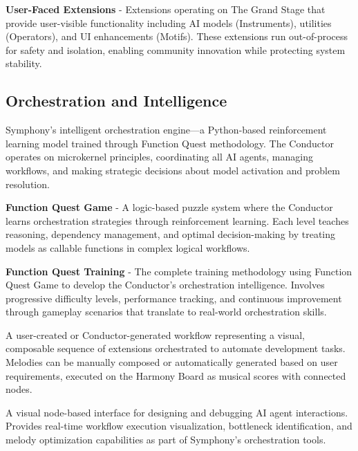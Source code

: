 \begin{description}[leftmargin=4cm,labelwidth=3.5cm]
\item[\textbf{UFE}] \textbf{User-Faced Extensions} - Extensions operating on The Grand Stage that provide user-visible functionality including AI models (Instruments), utilities (Operators), and UI enhancements (Motifs). These extensions run out-of-process for safety and isolation, enabling community innovation while protecting system stability.

\end{description}

\subsection*{Orchestration and Intelligence}

\begin{description}[leftmargin=4cm,labelwidth=3.5cm]

\item[\textbf{Conductor}] Symphony's intelligent orchestration engine—a Python-based reinforcement learning model trained through Function Quest methodology. The Conductor operates on microkernel principles, coordinating all AI agents, managing workflows, and making strategic decisions about model activation and problem resolution.

\item[\textbf{FQG}] \textbf{Function Quest Game} - A logic-based puzzle system where the Conductor learns orchestration strategies through reinforcement learning. Each level teaches reasoning, dependency management, and optimal decision-making by treating models as callable functions in complex logical workflows.

\item[\textbf{FQT}] \textbf{Function Quest Training} - The complete training methodology using Function Quest Game to develop the Conductor's orchestration intelligence. Involves progressive difficulty levels, performance tracking, and continuous improvement through gameplay scenarios that translate to real-world orchestration skills.

\item[\textbf{Melody}] A user-created or Conductor-generated workflow representing a visual, composable sequence of extensions orchestrated to automate development tasks. Melodies can be manually composed or automatically generated based on user requirements, executed on the Harmony Board as musical scores with connected nodes.

\item[\textbf{Harmony Board}] A visual node-based interface for designing and debugging AI agent interactions. Provides real-time workflow execution visualization, bottleneck identification, and melody optimization capabilities as part of Symphony's orchestration tools.

\end{description}

